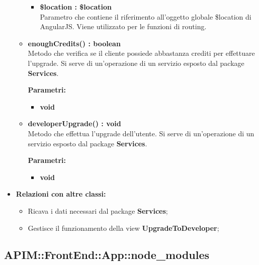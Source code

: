 \begin{itemize}
\begin{itemize}
\begin{itemize}
			\item \textbf{\$location : \$location}\\
			Parametro che contiene il riferimento all'oggetto globale \$location di AngularJS. Viene utilizzato per le funzioni di routing.
			
		\end{itemize}
		
		\item \textbf{enoughCredits() : boolean}\\
		Metodo che verifica se il cliente possiede abbastanza crediti per effettuare l'upgrade. Si serve di un'operazione di un servizio esposto dal package \textbf{Services}.
		\begin{description}
			\item[\textbf{Parametri:}]
		\end{description}
		\begin{itemize}
			\item \textbf{void}\\
		\end{itemize}
		
		\item \textbf{developerUpgrade() : void}\\
		Metodo che effettua l'upgrade dell'utente. Si serve di un'operazione di un servizio esposto dal package \textbf{Services}.
		\begin{description}
			\item[\textbf{Parametri:}]
		\end{description}
		\begin{itemize}
			\item \textbf{void}\\
		\end{itemize}
		
		
		
	\end{itemize}
	\item \textbf{Relazioni con altre classi:}
	\begin{itemize}
		\item Ricava i dati necessari dal package \textbf{Services};
		\item Gestisce il funzionamento della view \textbf{UpgradeToDeveloper};
	\end{itemize}
\end{itemize}


\subsection{APIM::FrontEnd::App::node\_modules}

